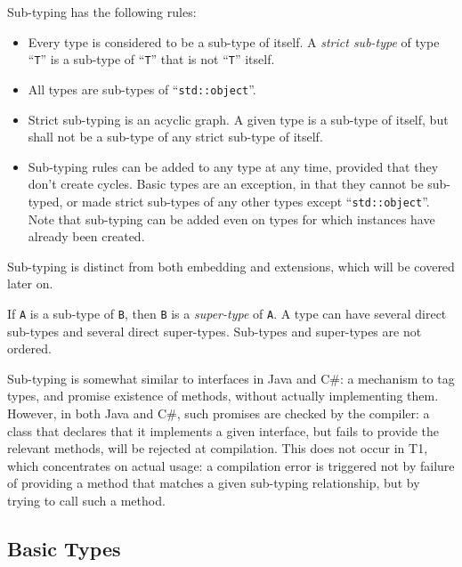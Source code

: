 Sub-typing has the following rules:
\begin{itemize}

    \item Every type is considered to be a sub-type of itself. A
    \emph{strict sub-type} of type ``\verb|T|'' is a sub-type of
    ``\verb|T|'' that is not ``\verb|T|'' itself.

    \item All types are sub-types of ``\verb|std::object|''.

    \item Strict sub-typing is an acyclic graph. A given type is
    a sub-type of itself, but shall not be a sub-type of any
    strict sub-type of itself.

    \item Sub-typing rules can be added to any type at any time,
    provided that they don't create cycles. Basic types are an
    exception, in that they cannot be sub-typed, or made strict
    sub-types of any other types except ``\verb|std::object|''. Note
    that sub-typing can be added even on types for which instances have
    already been created.

\end{itemize}

Sub-typing is distinct from both embedding and extensions, which will be
covered later on.

If \verb|A| is a sub-type of \verb|B|, then \verb|B| is a \emph{super-type}
of \verb|A|. A type can have several direct sub-types and several direct
super-types. Sub-types and super-types are not ordered.

\begin{rationale}
Sub-typing is somewhat similar to interfaces in Java and C\#: a
mechanism to tag types, and promise existence of methods, without
actually implementing them. However, in both Java and C\#, such promises
are checked by the compiler: a class that declares that it implements a
given interface, but fails to provide the relevant methods, will be
rejected at compilation. This does not occur in T1, which concentrates
on actual usage: a compilation error is triggered not by failure of
providing a method that matches a given sub-typing relationship, but
by trying to call such a method.
\end{rationale}

\subsection{Basic Types}

